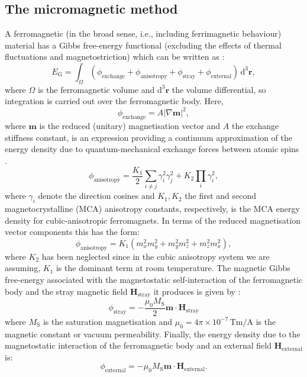 \subsection{The micromagnetic method}
A ferromagnetic (in the broad sense, i.e., including ferrimagnetic behaviour) material has a Gibbs free-energy functional (excluding the effects of thermal fluctuations and magnetostriction) which can be written as \citep{Brown}:
\begin{equation}
E_\text{G} = \int_{\Omega} (\phi_{\text{exchange}} + \phi_{\text{anisotropy}} + \phi_{\text{stray}} + \phi_{\text{external}})\,\text{d}^3 \boldsymbol{r},
\end{equation}
where $\Omega$ is the ferromagnetic volume and $\text{d}^3 \boldsymbol{r}$ the volume differential, so integration is carried out over the ferromagnetic body. Here,
\begin{equation}
\phi_{\text{exchange}}=A|\nabla\boldsymbol{m}|^2,
\end{equation}
where $\boldsymbol{m}$ is the reduced (unitary) magnetisation vector and $A$ the exchange stiffness constant, is an expression providing a continuum approximation of the energy density due to quantum-mechanical exchange forces between atomic spins \citep{Landau1935}.
\begin{equation}
\phi_{\text{anisotropy}}=\frac{K_1}{2}\sum_{i\neq j}\gamma_i^2\gamma_j^2 + K_2\prod_i\gamma_i^2,
\end{equation}
where $\gamma_i$ denote the direction cosines and $K_1,K_2$ the first and second magnetocrystalline (MCA) anisotropy constants, respectively, is the MCA energy density for cubic-anisotropic ferromagnets. In terms of the reduced magnetisation vector components this has the form:
\begin{equation}
\phi_{\text{anisotropy}}=K_1(m_x^2m_y^2+m_y^2m_z^2+m_z^2m_x^2),
\end{equation}
where $K_2$ has been neglected since in the cubic anisotropy system we are assuming, $K_1$ is the dominant term at room temperature. The magnetic Gibbs free-energy associated with the magnetostatic self-interaction of the ferromagnetic body and the stray magnetic field $\boldsymbol{H}_{\text{stray}}$ it produces is given by \citep{Brown}:
\begin{equation}
\phi_{\text{stray}}=-\frac{\mu_0M_\text{S}}{2} \boldsymbol{m} \cdot \boldsymbol{H}_{\text{stray}}
\end{equation}
where $M_\text{S}$ is the saturation magnetisation and $\mu_0=4\pi \times 10^{{-}7}\,\text{T}\text{m}/\text{A}$ is the magnetic constant or vacuum permeability. Finally, the energy density due to the magnetostatic interaction of the ferromagnetic body and an external field $\boldsymbol{H}_{\text{external}}$ is:
\begin{equation}
\phi_{\text{external}}=-\mu_0 M_{\text{S}} \boldsymbol{m} \cdot \boldsymbol{H}_{\text{external}}.
\end{equation}

